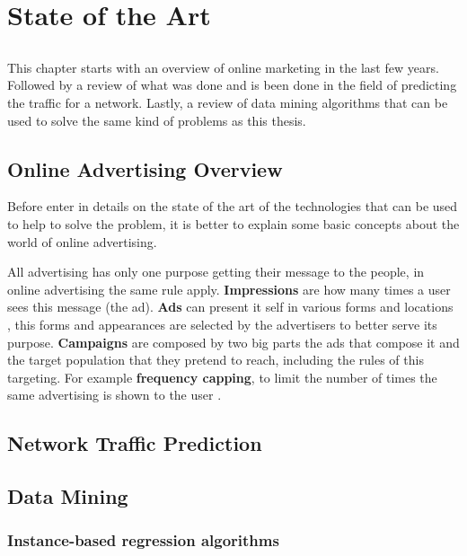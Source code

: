 \chapter{State of the Art} \label{chap:sota}

\section*{}

This chapter starts with an overview of online marketing in the last few years.
Followed by a review of what was done and is been done in the field of predicting the traffic for a network.
Lastly, a review of data mining algorithms that can be used to solve the same kind of problems as this thesis.

\section{Online Advertising Overview}

Before enter in details on the state of the art of the technologies that can be used to help to solve the problem, it is better to explain
some basic concepts about the world of online advertising. 

All advertising has only one purpose getting their message to the people, in online advertising the same rule apply. \textbf{Impressions} are how
many times a user sees this message (the ad).\cite{kOA} \textbf{Ads} can present it self in various forms and locations \cite{kOA2}, this forms and appearances
\cite{kOA3} are selected by the advertisers to better serve its purpose. 
\textbf{Campaigns} are composed by two big parts the ads that compose it and the target population that they pretend to reach, including the rules of this targeting.
For example \textbf{frequency capping}, to limit the number of times the same advertising is shown to the user \cite{kOA}. 


\section{Network Traffic Prediction}\label{sec:network}

\section{Data Mining}\label{sec:datamining}

\subsection{Instance-based regression algorithms}\label{sec:instance}

